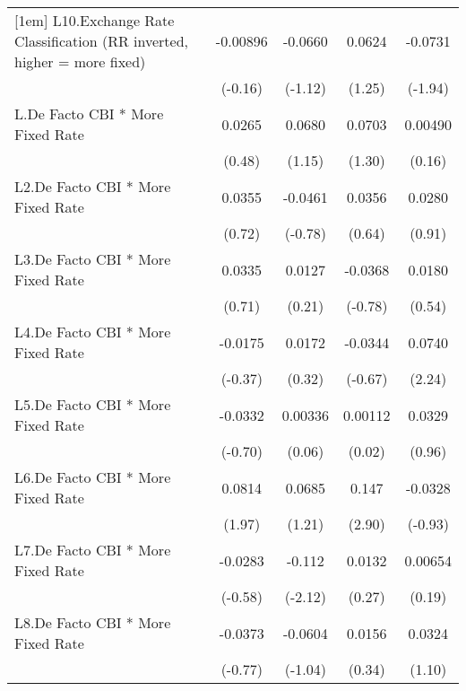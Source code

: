 {\begin{longtable}{l*{4}{c}}
[1em]
L10.Exchange Rate Classification (RR inverted, higher = more fixed)& -0.00896         &  -0.0660         &   0.0624         &  -0.0731         \\
                &  (-0.16)         &  (-1.12)         &   (1.25)         &  (-1.94)         \\
[1em]
L.De Facto CBI * More Fixed Rate&   0.0265         &   0.0680         &   0.0703         &  0.00490         \\
                &   (0.48)         &   (1.15)         &   (1.30)         &   (0.16)         \\
[1em]
L2.De Facto CBI * More Fixed Rate&   0.0355         &  -0.0461         &   0.0356         &   0.0280         \\
                &   (0.72)         &  (-0.78)         &   (0.64)         &   (0.91)         \\
[1em]
L3.De Facto CBI * More Fixed Rate&   0.0335         &   0.0127         &  -0.0368         &   0.0180         \\
                &   (0.71)         &   (0.21)         &  (-0.78)         &   (0.54)         \\
[1em]
L4.De Facto CBI * More Fixed Rate&  -0.0175         &   0.0172         &  -0.0344         &   0.0740\sym{*}  \\
                &  (-0.37)         &   (0.32)         &  (-0.67)         &   (2.24)         \\
[1em]
L5.De Facto CBI * More Fixed Rate&  -0.0332         &  0.00336         &  0.00112         &   0.0329         \\
                &  (-0.70)         &   (0.06)         &   (0.02)         &   (0.96)         \\
[1em]
L6.De Facto CBI * More Fixed Rate&   0.0814\sym{*}  &   0.0685         &    0.147\sym{**} &  -0.0328         \\
                &   (1.97)         &   (1.21)         &   (2.90)         &  (-0.93)         \\
[1em]
L7.De Facto CBI * More Fixed Rate&  -0.0283         &   -0.112\sym{*}  &   0.0132         &  0.00654         \\
                &  (-0.58)         &  (-2.12)         &   (0.27)         &   (0.19)         \\
[1em]
L8.De Facto CBI * More Fixed Rate&  -0.0373         &  -0.0604         &   0.0156         &   0.0324         \\
                &  (-0.77)         &  (-1.04)         &   (0.34)         &   (1.10)         \\

\end{longtable}}
